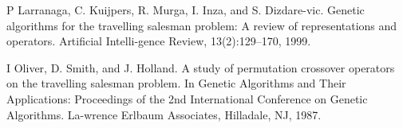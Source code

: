 \documentclass[twoside]{article}
\begin{document}
\begin{multicols}{2}
\begin{thebibliography}{99}
\bibitem P Larranaga, C. Kuijpers, R. Murga, I. Inza, and S. Dizdare-vic. Genetic algorithms for the travelling salesman problem: A review of representations and operators. Artificial Intelli-gence Review, 13(2):129–170, 1999.

\bibitem I Oliver, D. Smith, and J. Holland. A study of permutation
crossover operators on the travelling salesman problem. In
Genetic Algorithms and Their Applications: Proceedings of
the 2nd International Conference on Genetic Algorithms. La-wrence Erlbaum Associates, Hilladale, NJ, 1987.

\end{thebibliography}


\end{multicols}
\end{document}
